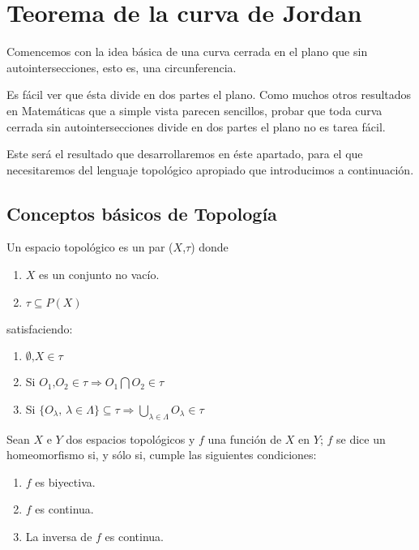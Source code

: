 \section{Teorema de la curva de Jordan}

Comencemos con la idea básica de una curva cerrada en el plano que sin autointersecciones, esto es, una circunferencia.

Es fácil ver   que  ésta divide en dos partes el plano. Como muchos otros resultados en Matemáticas que a simple vista parecen sencillos, probar que toda curva cerrada sin autointersecciones divide en dos partes el plano no es tarea fácil.

Este será el resultado que desarrollaremos en éste apartado, para el que necesitaremos del lenguaje topológico apropiado que introducimos a continuación.

\subsection{Conceptos básicos de Topología}

\begin{definition}
	Un espacio topológico es un par ($X$,$\tau$) donde
	\begin{enumerate}
		\item  $X$ es un conjunto no vacío.
		\item $\tau \subseteq \mathit{P}(X)$
	\end{enumerate}
	satisfaciendo:
	\begin{enumerate}
		\item $\emptyset \text{,} X \in \tau$
		\item Si $O_1 \text{,} O_2 \in \tau \Longrightarrow O_1 \bigcap O_2 \in \tau$
		\item Si $\{ O_\lambda \text{, } \lambda \in \Lambda \} \subseteq \tau \Longrightarrow \bigcup_{\lambda \in \Lambda} O_\lambda \in \tau$
	\end{enumerate}
\end{definition}


\begin{definition}
	Sean $X$ e $Y$ dos espacios topológicos y $f$ una función de $X$ en $Y$; $f$ se dice un homeomorfismo si, y sólo si, cumple las siguientes condiciones:
	\begin{enumerate}
		\item $f$ es biyectiva.
		\item $f$ es continua.
		\item La inversa de $f$ es continua.
	\end{enumerate}
\end{definition}

